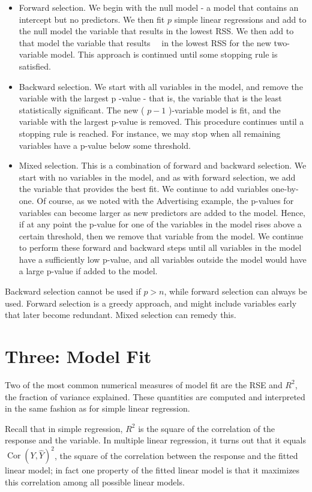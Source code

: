 \documentclass[10pt]{article}
\begin{document}
\begin{itemize}
  \item Forward selection. We begin with the null model - a model that contains an intercept but no predictors. We then fit $p$ simple linear regressions and add to the null model the variable that results in the lowest RSS. We then add to that model the variable that results\
\
in the lowest RSS for the new two-variable model. This approach is continued until some stopping rule is satisfied.
  \item Backward selection. We start with all variables in the model, and remove the variable with the largest p -value - that is, the variable that is the least statistically significant. The new ( $p-1$ )-variable model is fit, and the variable with the largest p-value is removed. This procedure continues until a stopping rule is reached. For instance, we may stop when all remaining variables have a p-value below some threshold.
  \item Mixed selection. This is a combination of forward and backward selection. We start with no variables in the model, and as with forward selection, we add the variable that provides the best fit. We continue to add variables one-by-one. Of course, as we noted with the Advertising example, the p-values for variables can become larger as new predictors are added to the model. Hence, if at any point the p-value for one of the variables in the model rises above a certain threshold, then we remove that variable from the model. We continue to perform these forward and backward steps until all variables in the model have a sufficiently low p-value, and all variables outside the model would have a large p-value if added to the model.
\end{itemize}

Backward selection cannot be used if $p>n$, while forward selection can always be used. Forward selection is a greedy approach, and might include variables early that later become redundant. Mixed selection can remedy this.

\section*{Three: Model Fit}
Two of the most common numerical measures of model fit are the RSE and $R^{2}$, the fraction of variance explained. These quantities are computed and interpreted in the same fashion as for simple linear regression.

Recall that in simple regression, $R^{2}$ is the square of the correlation of the response and the variable. In multiple linear regression, it turns out that it equals $\operatorname{Cor}(Y, \hat{Y})^{2}$, the square of the correlation between the response and the fitted linear model; in fact one property of the fitted linear model is that it maximizes this correlation among all possible linear models.
\end{document}
